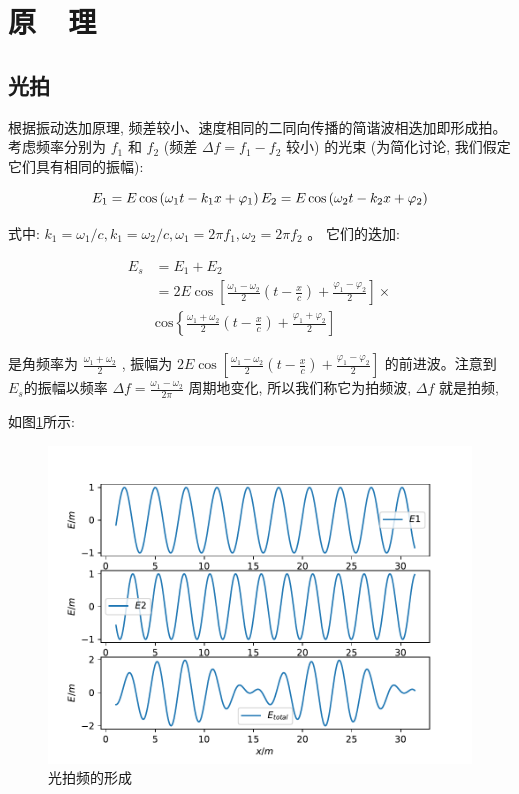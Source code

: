 \documentclass{buaaemp}
\begin{document}
\section{原~~理}

\subsection{光拍}
根据振动迭加原理, 频差较小、速度相同的二同向传播的简谐波相迭加即形成拍。考虑频率分别为 $ f_{1}$  和 $ f_{2} $ (频差  $\Delta f=f_{1}-f_{2}$  较小) 的光束 (为简化讨论, 我们假定它们具有相同的振幅):

\begin{equation}
    E_{1}=E \cos \left(\omega_{1} t-k_{1} x+\varphi_{1}\right) \\
E_{2}=E \cos \left(\omega_{2} t-k_{2} x+\varphi_{2}\right)
\end{equation}

式中:  $k_{1}=\omega_{1} / c, k_{1}=\omega_{2} / c, \omega_{1}=2 \pi f_{1}, \omega_{2}=2 \pi f_{2} $ 。
它们的迭加:

\begin{align*}
    E_{s}&=E_{1}+E_{2} \\
    &=2 E \cos \left[\frac{\omega_{1}-\omega_{2}}{2}\left(t-\frac{x}{c}\right)+\frac{\varphi_{1}-\varphi_{2}}{2}\right] \times \\
    &\mathrm{cos}\left\{\frac{\omega_{1}+\omega_{2}}{2}\left(t-\frac{x}{c}\right)+\frac{\varphi_{1}+\varphi_{2}}{2}\right]
\end{align*}
    

是角频率为  $\frac{\omega_{1}+\omega_{2}}{2}$ , 振幅为 $ 2 E \cos \left[\frac{\omega_{1}-\omega_{2}}{2}\left(t-\frac{x}{c}\right)+\frac{\varphi_{1}-\varphi_{2}}{2}\right]$  的前进波。注意到 $ E_{s}  $的振幅以频率  $\Delta f=\frac{\omega_{1}-\omega_{2}}{2 \pi}$  周期地变化, 所以我们称它为拍频波,  $\Delta f$  就是拍频, 


如图\ref{fig:beat}所示:
\begin{figure}
    \centering
    \includegraphics[width=0.9\linewidth]{image/beat.pdf}
    \caption{光拍频的形成}
    \label{fig:beat}
\end{figure}
\end{document}
